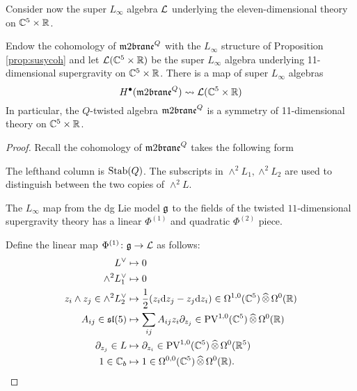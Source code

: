 Consider now the super $L_\infty$ algebra $\mathcal L$ underlying the eleven-dimensional theory on $\mathbb C^5 \times \mathbb R$. 

\begin{prop}
Endow the cohomology of $\m2^Q$ with the $L_\infty$ structure of Proposition \ref{prop:susycoh} and let $\mathcal L(\mathbb C^5 \times \mathbb R)$ be the super $L_\infty$ algebra underlying 11-dimensional supergravity on $\mathbb C^5 \times \mathbb R$. 
There is a map of super $L_\infty$ algebras 
\[
H^\bu(\m2^Q) \rightsquigarrow \cL (\CC^5 \times \RR)
\]
In particular, the $Q$-twisted algebra $\m2^Q$ is a symmetry of 11-dimensional theory on $\mathbb C^5 \times \mathbb R$. 
\end{prop}
\begin{proof}
Recall the cohomology of $\m2^Q$ takes the following form
\beqn 
{}
\eeqn
The lefthand column is ${\rm Stab}(Q)$. 
The subscripts in $\wedge^2 L_1, \wedge^2 L_2$ are used to distinguish between the two copies of $\wedge^2 L$.

The $L_\infty$ map from the dg Lie model $\mathfrak g$ to the fields of the twisted $11$-dimensional supergravity theory has a linear $\Phi^{(1)}$ and quadratic $\Phi^{(2)}$ piece.

Define the linear map $\Phi^{(1)} \colon \mathfrak g \to \mathcal L$ as follows:
\begin{align*}
 L^\vee & \mapsto 0 \\
 \wedge^2 L_1^\vee  & \mapsto 0 \\
z_i \wedge z_j \in \wedge^2 L^\vee_2 & \mapsto \frac12 (z_i \d z_j - z_j \d z_i) \in \Omega^{1,0} (\CC^5) \hotimes \Omega^0 (\RR) \\
A_{ij} \in \lie{sl}(5) & \mapsto \sum_{ij} A_{ij} z_i \partial_{z_j} \in \PV^{1,0}(\CC^5) \hotimes \Omega^0(\RR) \\ \partial_{z_j} \in L & \mapsto
\partial_{z_i} \in \PV^{1,0} (\CC^5) \hotimes \Omega^0 (\RR^5) \\ %
1 \in \CC_b & \mapsto 1 \in \Omega^{0,0}(\CC^5) \hotimes \Omega^0 (\RR) .
\end{align*}


\end{proof}

